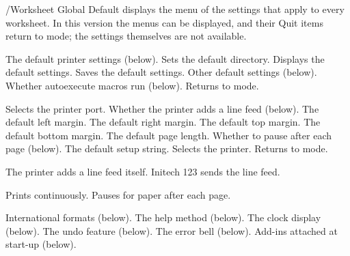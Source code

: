 /Worksheet Global Default displays the menu of the settings that apply to
every worksheet.  In this version the menus can be displayed, and their
Quit items return to  mode; the settings themselves are not
available.
\begin{Options}
 The default printer settings (below).
 Sets the default directory.
 Displays the default settings.
 Saves the default settings.
 Other default settings (below).
 Whether autoexecute macros run (below).
 Returns to  mode.
\end{Options}
\begin{Options}
 Selects the printer port.
 Whether the printer adds a line feed (below).
 The default left margin.
 The default right margin.
 The default top margin.
 The default bottom margin.
 The default page length.
 Whether to pause after each page (below).
 The default setup string.
 Selects the printer.
 Returns to  mode.
\end{Options}
\begin{Options}
 The printer adds a line feed itself.
 Initech 123 sends the line feed.
\end{Options}
\begin{Options}
 Prints continuously.
 Pauses for paper after each page.
\end{Options}
\begin{Options}
 International formats (below).
 The help method (below).
 The clock display (below).
 The undo feature (below).
 The error bell (below).
 Add-ins attached at start-up (below).
\end{Options}

